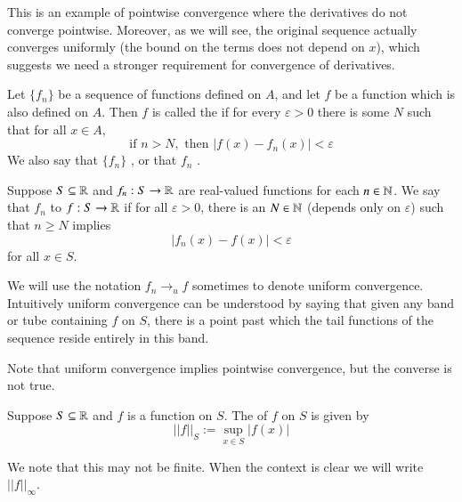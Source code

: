 \documentclass[12pt, a4paper, oneside, openright, titlepage]{book}
\begin{document}
This is an example of pointwise convergence where the derivatives do not converge pointwise. Moreover, as we will see, the original sequence actually converges uniformly (the bound on the terms does not depend on $x$), which suggests we need a stronger requirement for convergence of derivatives.





\begin{defn}
    Let $\{f_n\}$ be a sequence of functions defined on $A$, and let $f$ be a function which is also defined on $A$. Then $f$ is called the  if for every $\varepsilon > 0$ there is some $N$ such that for all $x \in A$, \begin{equation*}
        \text{if } n> N, \text{ then } |f(x) - f_n(x)| < \varepsilon
    \end{equation*}
    We also say that $\{f_n\}$ , or that $f_n$ .
\end{defn}


\begin{defn}
    Suppose $S \subseteq \mathbb R$ and $f_n:S\rightarrow \mathbb R$ are real-valued functions for each $n \in \mathbb N$. We say that $f_n$  to $f:S\rightarrow \mathbb R$ if for all $\varepsilon > 0$, there is an $N \in \mathbb N$ (depends only on $\varepsilon$) such that $n \geq N$ implies \begin{equation*}
        |f_n(x) - f(x)| < \varepsilon
    \end{equation*}
    for all $x \in S$.
\end{defn}

We will use the notation $f_n\rightarrow_uf$ sometimes to denote uniform convergence. Intuitively uniform convergence can be understood by saying that given any band or tube containing $f$ on $S$, there is a point past which the tail functions of the sequence reside entirely in this band.

\begin{rmk}
    Note that uniform convergence implies pointwise convergence, but the converse is not true.
\end{rmk}

\begin{defn}
    Suppose $S \subseteq \mathbb R$ and $f$ is a function on $S$. The  of $f$ on $S$ is given by \begin{equation*}
        ||f||_S := \sup\limits_{x\in S}|f(x)|
    \end{equation*}
\end{defn}
We note that this may not be finite. When the context is clear we will write $||f||_{\infty}$.
\end{document}
